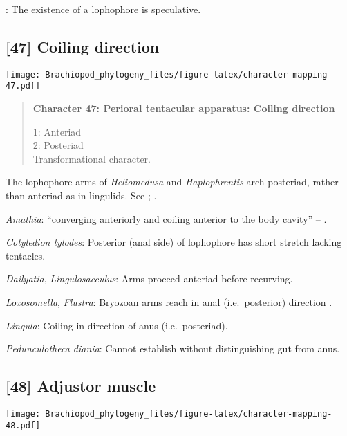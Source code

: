 \documentclass[openany]{book}
\theoremstyle{definition}
\theoremstyle{definition}
\theoremstyle{definition}
\theoremstyle{remark}
\begin{document}
\hypertarget{TAXLABELS-coding-46}{}
: The existence of a lophophore is speculative.

\subsection*{{[}47{]} Coiling direction}\label{coiling-direction}

\texttt{[image: Brachiopod\_phylogeny\_files/figure-latex/character-mapping-47.pdf]}

\begin{quote}
\textbf{Character 47: Perioral tentacular apparatus: Coiling direction}

1: Anteriad\\
2: Posteriad\\
Transformational character.
\end{quote}

The lophophore arms of \emph{Heliomedusa} and \emph{Haplophrentis} arch
posteriad, rather than anteriad as in lingulids. See
\citet{Zhang2009Architectureand}; \citet{Moysiuk2017Hyolithsare}.

\hypertarget{Amathia-coding-47}{}
\emph{Amathia}: ``converging anteriorly and coiling anterior to the body
cavity'' -- \citet{Zhang2009Architectureand}.

\hypertarget{Cotyledion_tylodes-coding-47}{}
\emph{Cotyledion tylodes}: Posterior (anal side) of lophophore has short
stretch lacking tentacles.

\hypertarget{Dailyatia-coding-47}{}
\emph{Dailyatia}, \emph{Lingulosacculus}: Arms proceed anteriad before
recurving.

\hypertarget{Flustra-coding-47}{}
\emph{Loxosomella}, \emph{Flustra}: Bryozoan arms reach in anal
(i.e.~posterior) direction \citep{Shunkina2015}.

\hypertarget{Lingula-coding-47}{}
\emph{Lingula}: Coiling in direction of anus (i.e.~posteriad).

\hypertarget{Pedunculotheca_diania-coding-47}{}
\emph{Pedunculotheca diania}: Cannot establish without distinguishing
gut from anus.

\subsection*{{[}48{]} Adjustor muscle}\label{adjustor-muscle}

\texttt{[image: Brachiopod\_phylogeny\_files/figure-latex/character-mapping-48.pdf]}
\end{document}
